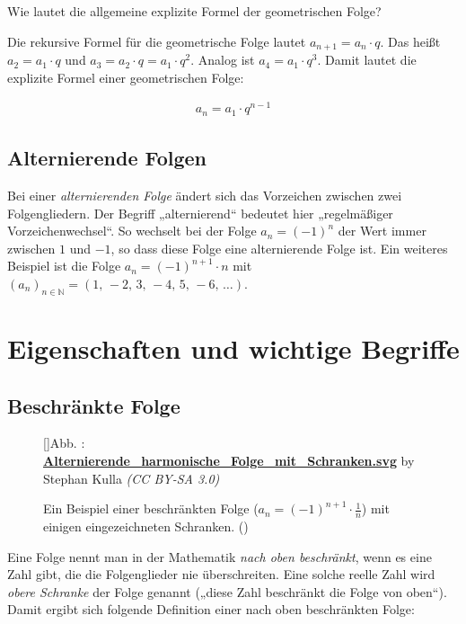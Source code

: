 \documentclass[fontsize=9pt,
               parskip=half-,
               DIV=14,
               listof=chapterentry,
               tocflat]{scrbook}
\newcounter{imagelabel}
\begin{document}
\begin{mdframed}[style=semanticbox,frametitleaboveskip=3pt,innerbottommargin=3pt,frametitle=Frage]
Wie lautet die allgemeine explizite Formel der geometrischen Folge?

\end{mdframed}

\begin{answer*}
Die rekursive Formel für die geometrische Folge lautet $a_{n+1}=a_{n}\cdot q$. Das heißt $a_{2}=a_{1}\cdot q$ und $a_{3}=a_{2}\cdot q=a_{1}\cdot q^{2}$. Analog ist $a_{4}=a_{1}\cdot q^{3}$. Damit lautet die explizite Formel einer geometrischen Folge:

\begin{align*}
a_{n}=a_{1}\cdot q^{n-1}
\end{align*}

\end{answer*}

\subsection{Alternierende Folgen}

Bei einer \emph{alternierenden Folge} ändert sich das Vorzeichen zwischen zwei Folgengliedern. Der Begriff „alternierend“ bedeutet hier „regelmäßiger Vorzeichenwechsel“. So wechselt bei der Folge $a_{n}=(-1)^{n}$ der Wert immer zwischen $1$ und $-1$, so dass diese Folge eine alternierende Folge ist. Ein weiteres Beispiel ist die Folge $a_{n}=(-1)^{n+1}\cdot n$ mit $\left(a_{n}\right)_{n\in \mathbb {N} }=(1,\,-2,\,3,\,-4,\,5,\,-6,\,\ldots )$.

\section{Eigenschaften und wichtige Begriffe}

\subsection{Beschränkte Folge}

\begin{figure}[h]
\vspace{\baselineskip}
[]{Abb. : \protect\href{https://commons.wikimedia.org/wiki/File:Alternierende_harmonische_Folge_mit_Schranken.svg}{\textbf{Alternierende\allowbreak\_harmonische\allowbreak\_Folge\allowbreak\_mit\allowbreak\_Schranken.svg}} by Stephan Kulla \textit{(CC BY-SA 3.0)}}\centering
{}
\caption*{Ein Beispiel einer beschränkten Folge ($a_{n}=(-1)^{n+1}\cdot {\tfrac {1}{n}}$) mit einigen eingezeichneten Schranken. ()}
\end{figure}
Eine Folge nennt man in der Mathematik \emph{nach oben beschränkt}, wenn es eine Zahl gibt, die die Folgenglieder nie überschreiten. Eine solche reelle Zahl wird \emph{obere Schranke} der Folge genannt („diese Zahl beschränkt die Folge von oben“). Damit ergibt sich folgende Definition einer nach oben beschränkten Folge:
\end{document}
